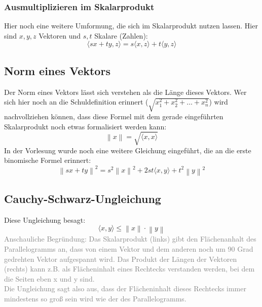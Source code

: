 \documentclass{report}
\begin{document}
			\subsubsection{Ausmultiplizieren im Skalarprodukt}
				Hier noch eine weitere Umformung, die sich im Skalarprodukt nutzen lassen. Hier sind $x, y, z$ Vektoren und $s, t$ Skalare (Zahlen):
				\begin{equation}
					\langle sx + ty, z \rangle = s\langle x, z \rangle + t\langle y, z \rangle
				\end{equation}
		\subsection{Norm eines Vektors}
			Der Norm eines Vektors lässt sich verstehen als die Länge dieses Vektors. Wer sich hier noch an die Schuldefinition erinnert ($\sqrt{x_1^2+x_2^2+\dots+x_n^2}$) wird nachvollziehen können, dass diese Formel mit dem gerade eingeführten Skalarprodukt noch etwas formalisiert werden kann:
			\begin{equation}
				\left\lVert x \right\rVert = \sqrt{\langle x, x \rangle}
			\end{equation}
			In der Vorlesung wurde noch eine weitere Gleichung eingeführt, die an die erste binomische Formel erinnert:
			\begin{equation}
					\left\lVert sx + ty \right\rVert^2 = s^2\left\lVert x \right\rVert^2 + 2st\langle x, y \rangle + t^2 \left\lVert y \right\rVert^2
			\end{equation}
		\subsection{Cauchy-Schwarz-Ungleichung}
			Diese Ungleichung besagt:
			\begin{equation}
				\langle x, y \rangle \leq \left\lVert x \right\rVert \cdot \left\lVert y \right\rVert
			\end{equation}	
			\textcolor{gray}{Anschauliche Begründung: Das Skalarprodukt (links) gibt den Flächenanhalt des Parallelogramms an, dass von einem Vektor und dem anderen noch um 90 Grad gedrehten Vektor aufgespannt wird. Das Produkt der Längen der Vektoren (rechts) kann z.B. als Flächeninhalt eines Rechtecks verstanden werden, bei dem die Seiten eben x und y sind.\\
			Die Ungleichung sagt also aus, dass der Flächeninhalt dieses Rechtecks immer mindestens so groß sein wird wie der des Parallelogramms.}
\end{document}
